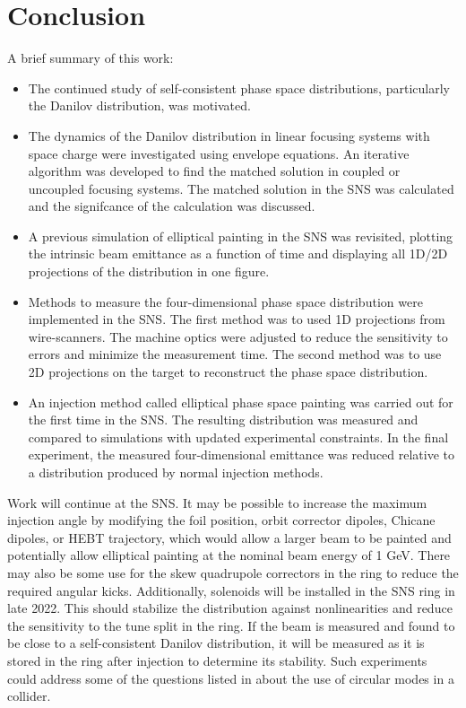 \chapter{Conclusion} \label{chap-6}

A brief summary of this work:
%
\begin{itemize}
    \item The continued study of self-consistent phase space distributions, particularly the Danilov distribution, was motivated.
    \item The dynamics of the Danilov distribution in linear focusing systems with space charge were investigated using envelope equations. An iterative algorithm was developed to find the matched solution in coupled or uncoupled focusing systems. The matched solution in the SNS was calculated and the signifcance of the calculation was discussed.
    \item A previous simulation of elliptical painting in the SNS was revisited, plotting the intrinsic beam emittance as a function of time and displaying all 1D/2D projections of the distribution in one figure.
    \item Methods to measure the four-dimensional phase space distribution were implemented in the SNS. The first method was to used 1D projections from wire-scanners. The machine optics were adjusted to reduce the sensitivity to errors and minimize the measurement time. The second method was to use 2D projections on the target to reconstruct the phase space distribution. 
    \item An injection method called elliptical phase space painting was carried out for the first time in the SNS. The resulting distribution was measured and compared to simulations with updated experimental constraints. In the final experiment, the measured four-dimensional emittance was reduced relative to a distribution produced by normal injection methods.
\end{itemize}
%

Work will continue at the SNS. It may be possible to increase the maximum injection angle by modifying the foil position, orbit corrector dipoles, Chicane dipoles, or HEBT trajectory, which would allow a larger beam to be painted and potentially allow elliptical painting at the nominal beam energy of 1 GeV. There may also be some use for the skew quadrupole correctors in the ring to reduce the required angular kicks. Additionally, solenoids will be installed in the SNS ring in late 2022. This should stabilize the distribution against nonlinearities and reduce the sensitivity to the tune split in the ring. If the beam is measured and found to be close to a self-consistent Danilov distribution, it will be measured as it is stored in the ring after injection to determine its stability. Such experiments could address some of the questions listed in \cite{Burov2013} about the use of circular modes in a collider. 

